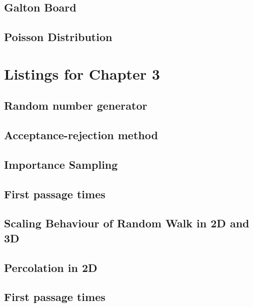 \subsection{Galton Board}

\subsection{Poisson Distribution}

\section{Listings for Chapter 3}

\subsection{Random number generator}

\subsection{Acceptance-rejection method}

\subsection{Importance Sampling}

\subsection{First passage times}

\subsection{Scaling Behaviour of Random Walk in 2D and 3D}

\subsection{Percolation in 2D}

\subsection{First passage times}


